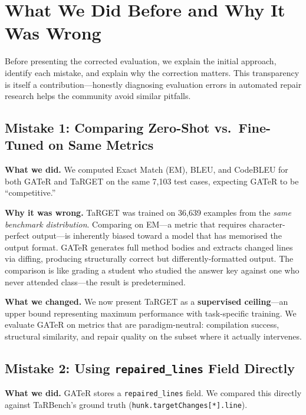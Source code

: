 \documentclass[conference,10pt]{IEEEtran}
\begin{document}
\section{What We Did Before and Why It Was Wrong}
\label{sec:wrong}

Before presenting the corrected evaluation, we explain the initial
approach, identify each mistake, and explain why the correction matters.
This transparency is itself a contribution---honestly diagnosing
evaluation errors in automated repair research helps the community
avoid similar pitfalls.

\subsection{Mistake 1: Comparing Zero-Shot vs.\ Fine-Tuned on Same Metrics}

\textbf{What we did.}  We computed Exact Match (EM), BLEU, and CodeBLEU
for both GATeR and TaRGET on the same 7{,}103 test cases, expecting
GATeR to be ``competitive.''

\textbf{Why it was wrong.}  TaRGET was trained on 36{,}639 examples
from the \emph{same benchmark distribution}.  Comparing on EM---a metric
that requires character-perfect output---is inherently biased toward a
model that has memorised the output format.  GATeR generates full
method bodies and extracts changed lines via diffing, producing
structurally correct but differently-formatted output.  The comparison
is like grading a student who studied the answer key against one who
never attended class---the result is predetermined.

\textbf{What we changed.}  We now present TaRGET as a
\textbf{supervised ceiling}---an upper bound representing maximum
performance with task-specific training.  We evaluate GATeR on
metrics that are paradigm-neutral: compilation success, structural
similarity, and repair quality on the subset where it actually
intervenes.

\subsection{Mistake 2: Using \texttt{repaired\_lines} Field Directly}

\textbf{What we did.}  GATeR stores a \texttt{repaired\_lines} field.
We compared this directly against TaRBench's ground truth
(\texttt{hunk.targetChanges[*].line}).
\end{document}
